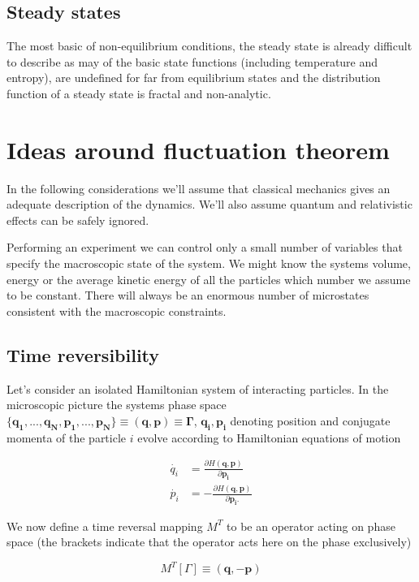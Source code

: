 \documentclass[a4paper,12pt,nofootinbib]{article}
\begin{document}
\subsection{Steady states}
The most basic of non-equilibrium conditions, the steady state is already difficult to describe as may of the basic state functions (including temperature and entropy), are undefined for far from equilibrium states and the distribution function of a steady state is fractal and non-analytic. 


\section{Ideas around fluctuation theorem}
In the following considerations we'll assume that classical mechanics gives an adequate description of the dynamics.
We'll also assume quantum and relativistic effects can be safely ignored.

Performing an experiment we can control only a small number of variables that specify the macroscopic state of the system. We might know the systems volume, energy or the average kinetic energy of all the particles which number we assume to be constant. There will always be an enormous number of microstates consistent with the macroscopic constraints.

\subsection{Time reversibility}
Let's consider an isolated Hamiltonian system of interacting particles.
In the microscopic picture the systems phase space $\{\bm{q_1},...,\bm{q_N},\bm{p_1},...,\bm{p_N} \} \equiv (\bm{q},\bm{p})\equiv \bm{\Gamma} $, $\bm{q_i}, \bm{p_i} $ denoting position and conjugate momenta of the particle $i$ evolve according to Hamiltonian equations of motion

\begin{equation}
\begin{aligned}
  \dot{q_i} &=\frac{\partial H(\bm{q},\bm{p})}{\partial{\bm{p_i}}} \\
  \dot{p_i} &=- \frac{\partial H(\bm{q},\bm{p})}{\partial{\bm{p_i}}.}
\end{aligned}
\end{equation}

We now define a time reversal mapping $M^T$ to be an operator acting on phase space (the brackets indicate that the operator acts here on the phase exclusively) 

\begin{equation}
  M^T[ \Gamma] \equiv (\bm{q},-\bm{p})
\end{equation}
\end{document}
